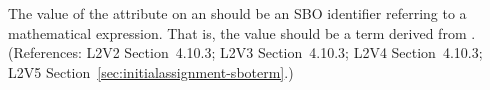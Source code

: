 The value of the  attribute on an \InitialAssignment should be an
SBO identifier referring to a mathematical expression.  That is, the value
should be a term derived from \sbomathformula.  (References: L2V2 Section~4.10.3;
L2V3 Section~4.10.3; L2V4 Section~4.10.3; L2V5 Section~\ref{sec:initialassignment-sboterm}.)
